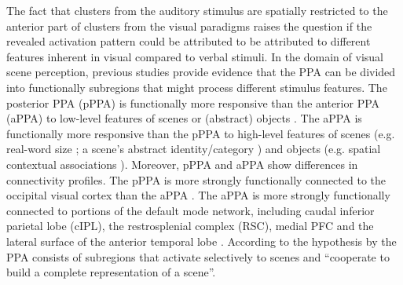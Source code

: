\documentclass[english]{article}
\begin{document}
The fact that clusters from the auditory stimulus are spatially restricted to
the anterior part of clusters from the visual paradigms raises the question if
the revealed activation pattern could be attributed to be attributed to
different features inherent in visual compared to verbal stimuli.
In the domain of visual scene perception, previous studies provide evidence that
the PPA can be divided into functionally subregions that might process different
stimulus features.
The posterior PPA (pPPA) is functionally more responsive than the anterior PPA
(aPPA) to low-level features of scenes or (abstract) objects
\citep{baldassano2013differential, nasr2014thinking,
rajimehr2011parahippocampal}.
The aPPA is functionally more responsive than the pPPA to high-level features of
scenes (e.g. real-word size \citep{park2015parametric}; a scene's abstract
identity/category \citep{marchette2015outside, watson2016patterns}) and objects
(e.g. spatial contextual associations \citep{aminoff2007parahippocampal,
aminoff2013role}).
Moreover, pPPA and aPPA show differences in connectivity profiles.
The pPPA is more strongly functionally connected to the occipital visual cortex
than the aPPA \citep{baldassano2013differential, baldassano2016two}.
The aPPA is more strongly functionally connected to portions of the default mode
network, including caudal inferior parietal lobe (cIPL), the restrosplenial
complex (RSC), medial PFC and the lateral surface of the anterior temporal lobe
\citep{baldassano2013differential, baldassano2016two}.
According to the hypothesis by \citep{baldassano2013differential} the PPA
consists of subregions that activate selectively to scenes and ``cooperate to
build a complete representation of a scene''.
\end{document}

